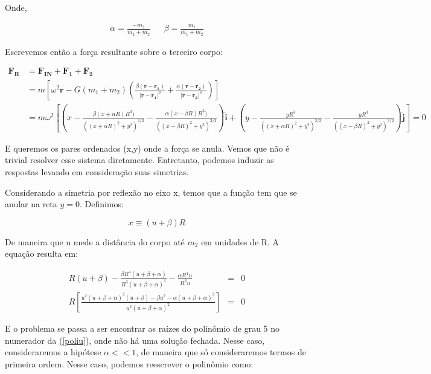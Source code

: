 Onde,

\begin{align}
\alpha = \frac{-m_2}{m_1+m_2} && \beta = \frac{m_1}{m_1+m_2}
\end{align}

Escrevemos então a força resultante sobre o terceiro corpo:

\begin{eqnarray}
\mathbf{F_R} &= \mathbf{F_{IN}} + \mathbf{F_1} + \mathbf{F_2} \\
&= m\left[\omega^2\mathbf{r} -G(m_1+m_2)\left(\frac{\beta(\mathbf{r}-\mathbf{r_1})}{|\mathbf{r}-\mathbf{r_1}|^3} + \frac{\alpha(\mathbf{r}-\mathbf{r_2})}{|\mathbf{r}-\mathbf{r_2}|^3}\right) \right] \\
&= m\omega^2 \left[\left(x - \frac{\beta(x+\alpha R) R^3)}{((x+\alpha R)^2 + y^2)^{3/2}} - \frac{\alpha(x-\beta R) R^3)}{((x-\beta R)^2 + y^2)^{3/2}}\right)\mathbf{\hat{i}} + \left(y - \frac{y R^3}{((x+\alpha R)^2 + y^2)^{3/2}} - \frac{y R^3}{((x-\beta R)^2 + y^2)^{3/2}}\right)\mathbf{\hat{j}}\right] =0
\end{eqnarray}

E queremos os pares ordenados (x,y) onde a força se anula. Vemos que não é trivial resolver esse sistema diretamente. Entretanto, podemos induzir as respostas levando em consideração suas simetrias.

Considerando a simetria por reflexão no eixo x, temos que a função tem que se anular na reta $y=0$. Definimos:

\begin{equation}
x \equiv (u+\beta)R
\end{equation}

De maneira que u mede a distância do corpo até $m_2$ em unidades de R. A equação resulta em:

\begin{eqnarray}
R(u+\beta) - \frac{\beta R^4(u+\beta+\alpha)}{R^3(u+\beta+\alpha)^3}- \frac{\alpha R^4u}{R^3u} & = & 0 \\
R\left[\frac{u^2(u+\beta+\alpha)^2(u+\beta)-\beta u^2 - \alpha(u+\beta+\alpha)^2}{u^2(u+\beta+\alpha)^2}\right] & = & 0 \label{poliu}
\end{eqnarray}

E o problema se passa a ser encontrar as raízes do polinômio de grau 5 no numerador da (\ref{poliu}), onde não há uma solução fechada. Nesse caso, consideraremos a hipótese $\alpha << 1$, de maneira que só consideraremos termos de primeira ordem. Nesse caso, podemos reescrever o polinômio como:

